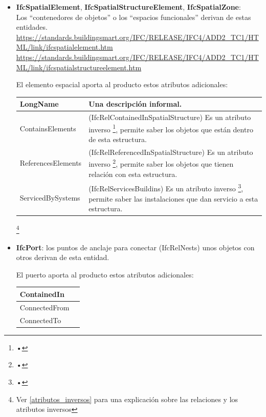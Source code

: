 \documentclass[spanish,12pt,a4paper,final,oneside]{book}
\begin{document}
\begin{itemize}
\item \textbf{IfcSpatialElement}, \textbf{IfcSpatialStructureElement}, \textbf{IfcSpatialZone}:
\\Los ``contenedores de objetos'' o los ``espacios funcionales'' derivan de estas entidades.
\\ \url{https://standards.buildingsmart.org/IFC/RELEASE/IFC4/ADD2_TC1/HTML/link/ifcspatialelement.htm}
\\ \url{https://standards.buildingsmart.org/IFC/RELEASE/IFC4/ADD2_TC1/HTML/link/ifcspatialstructureelement.htm}

El elemento espacial aporta al producto estos atributos adicionales:
\\ \begin{longtable}{|p{2.5cm} p{11cm}|}
\hline

LongName & Una descripción informal.
\\[0.1cm] \hline

ContainsElements & (IfcRelContainedInSpatialStructure) Es un atributo inverso \footnote{•}, permite saber los objetos que están dentro de esta estructura.
\\[0.1cm] \hline

ReferencesElements & (IfcRelReferencedInSpatialStructure) Es un atributo inverso \footnote{•}, permite saber los objetos que tienen relación con esta estructura.
\\[0.1cm] \hline

ServicedBySystems & (IfcRelServicesBuildins) Es un atributo inverso \footnote{•}, permite saber las instalaciones que dan servicio a esta estructura.
\\[0.1cm] \hline

\end{longtable}
\footnote{Ver \ref{atributos_inversos} para una explicación sobre las relaciones y los atributos inversos}


\item \textbf{IfcPort}: los puntos de anclaje para conectar (IfcRelNests) unos objetos con otros derivan de esta entidad.

El puerto aporta al producto estos atributos adicionales:
\\ \begin{longtable}{|p{2.5cm} p{11cm}|}
\hline
ContainedIn & 
\\[0.1cm] \hline
ConnectedFrom & 
\\[0.1cm] \hline
ConnectedTo &
\\[0.1cm] \hline
\end{longtable}


\end{itemize}
\end{document}
